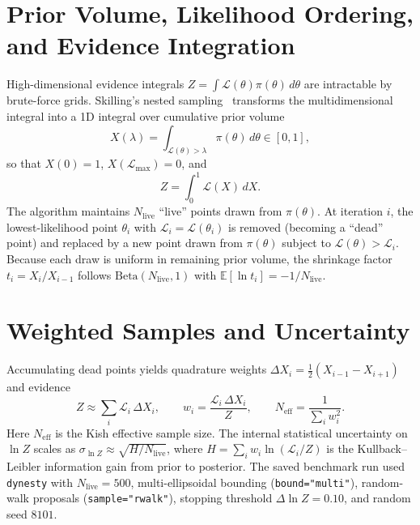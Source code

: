 \documentclass[11pt,a4paper]{report}
\begin{document}
\section{Prior Volume, Likelihood Ordering, and Evidence Integration}
High-dimensional evidence integrals $Z = \int \mathcal{L}(\theta)\pi(\theta)\,d\theta$ are intractable by brute-force grids. Skilling's nested sampling~\cite{Skilling2006,Speagle2020} transforms the multidimensional integral into a 1D integral over cumulative prior volume
\begin{equation}
X(\lambda) = \int_{\mathcal{L}(\theta) > \lambda} \pi(\theta)\,d\theta \in [0, 1],
\end{equation}
so that $X(0) = 1$, $X(\mathcal{L}_{\max}) = 0$, and
\begin{equation}
Z = \int_0^1 \mathcal{L}(X)\,dX.
\end{equation}
The algorithm maintains $N_{\mathrm{live}}$ ``live'' points drawn from $\pi(\theta)$. At iteration $i$, the lowest-likelihood point $\theta_i$ with $\mathcal{L}_i = \mathcal{L}(\theta_i)$ is removed (becoming a ``dead'' point) and replaced by a new point drawn from $\pi(\theta)$ subject to $\mathcal{L}(\theta) > \mathcal{L}_i$. Because each draw is uniform in remaining prior volume, the shrinkage factor $t_i = X_i / X_{i-1}$ follows $\mathrm{Beta}(N_{\mathrm{live}}, 1)$ with $\mathbb{E}[\ln t_i] = -1/N_{\mathrm{live}}$.

\section{Weighted Samples and Uncertainty}
Accumulating dead points yields quadrature weights $\Delta X_i = \frac{1}{2}(X_{i-1} - X_{i+1})$ and evidence
\begin{equation}
Z \approx \sum_i \mathcal{L}_i\,\Delta X_i, \qquad w_i = \frac{\mathcal{L}_i\,\Delta X_i}{Z}, \qquad N_{\mathrm{eff}} = \frac{1}{\sum_i w_i^2}.
\end{equation}
Here $N_{\mathrm{eff}}$ is the Kish effective sample size. The internal statistical uncertainty on $\ln Z$ scales as $\sigma_{\ln Z} \approx \sqrt{H / N_{\mathrm{live}}}$, where $H = \sum_i w_i \ln(\mathcal{L}_i / Z)$ is the Kullback--Leibler information gain from prior to posterior. The saved benchmark run used \texttt{dynesty} with $N_{\mathrm{live}} = 500$, multi-ellipsoidal bounding (\texttt{bound="multi"}), random-walk proposals (\texttt{sample="rwalk"}), stopping threshold $\Delta\ln Z = 0.10$, and random seed $8101$.
\end{document}
